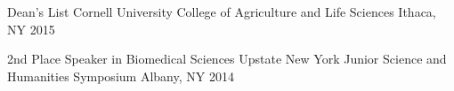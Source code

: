 



\begin{cvhonors}

\cvhonor
    {Dean's List} %
    {Cornell University College of Agriculture and Life Sciences} %
    {Ithaca, NY} %
    {2015} %

\cvhonor
    {2nd Place Speaker in Biomedical Sciences} %
    {Upstate New York Junior Science and Humanities Symposium} %
    {Albany, NY} %
    {2014} %


\end{cvhonors}







